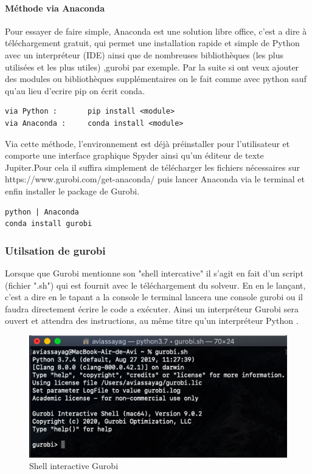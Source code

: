 \documentclass[a4paper, 12pt, twoside]{article}
\begin{document}
\paragraph{Méthode via Anaconda}{Pour essayer de faire simple, Anaconda est une solution libre office, c'est a dire à téléchargement gratuit, qui permet une installation rapide et simple de \textsf{Python} avec un interpréteur (IDE) ainsi que de nombreuses bibliothèques (les plus utilisées et les plus utiles) ,gurobi par exemple. Par la suite si ont veux ajouter des modules ou bibliothèques supplémentaires  on le fait comme avec python sauf qu'au lieu d'ecrire \textsf{pip} on écrit \textsf{conda}}.
\begin{verbatim}
via Python :       pip install <module>
via Anaconda :     conda install <module>
\end{verbatim}

Via cette méthode, l'environnement est déjà préinstaller pour l'utilisateur et comporte une interface graphique \textsf{Spyder} ainsi qu'un éditeur de texte \textsf{Jupiter}.Pour cela il suffira simplement de télécharger les fichiers nécessaires sur https://www.gurobi.com/get-anaconda/ puis lancer \textsf{Anaconda} via le terminal et enfin installer le package de \textsf{Gurobi}.
\begin{verbatim}
python | Anaconda
conda install gurobi 
\end{verbatim}


\subsubsection{Utilsation de gurobi}
Lorsque que \textsf{Gurobi} mentionne son "shell intercative" il s'agit en fait d'un script (fichier ".sh") qui est fournit avec le téléchargement du solveur. En en le lançant, c'est a dire en le tapant a la console le terminal lancera une console \textsf{gurobi} ou il faudra directement écrire le code a exécuter. Ainsi un interpréteur \textsf{Gurobi} sera ouvert et attendra des instructions, au même titre qu'un interpréteur \textsf{Python} .
\begin{center}
\begin{figure}[h!]
\centering
\includegraphics[scale=0.8]{console.png}
\caption{Shell interactive Gurobi }
\end{figure}
\end{center}
\end{document}
